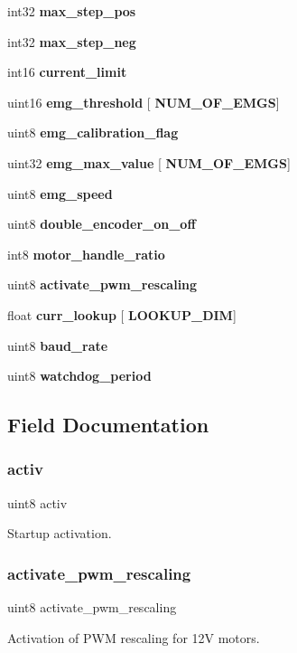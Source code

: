 \begin{DoxyCompactItemize}
int32 \textbf{ max\+\_\+step\+\_\+pos}
\item 
int32 \textbf{ max\+\_\+step\+\_\+neg}
\item 
int16 \textbf{ current\+\_\+limit}
\item 
uint16 \textbf{ emg\+\_\+threshold} [\textbf{ N\+U\+M\+\_\+\+O\+F\+\_\+\+E\+M\+GS}]
\item 
uint8 \textbf{ emg\+\_\+calibration\+\_\+flag}
\item 
uint32 \textbf{ emg\+\_\+max\+\_\+value} [\textbf{ N\+U\+M\+\_\+\+O\+F\+\_\+\+E\+M\+GS}]
\item 
uint8 \textbf{ emg\+\_\+speed}
\item 
uint8 \textbf{ double\+\_\+encoder\+\_\+on\+\_\+off}
\item 
int8 \textbf{ motor\+\_\+handle\+\_\+ratio}
\item 
uint8 \textbf{ activate\+\_\+pwm\+\_\+rescaling}
\item 
float \textbf{ curr\+\_\+lookup} [\textbf{ L\+O\+O\+K\+U\+P\+\_\+\+D\+IM}]
\item 
uint8 \textbf{ baud\+\_\+rate}
\item 
uint8 \textbf{ watchdog\+\_\+period}
\end{DoxyCompactItemize}


\subsection{Field Documentation}
\mbox{\label{structst__mem_a63bbebc1db55f43e0571006597a3488b}} 
\subsubsection{activ}
{\footnotesize\ttfamily uint8 activ}

Startup activation. \mbox{\label{structst__mem_a53d9d645351f4020826ab8c56c91b244}} 
\subsubsection{activate\+\_\+pwm\+\_\+rescaling}
{\footnotesize\ttfamily uint8 activate\+\_\+pwm\+\_\+rescaling}

Activation of P\+WM rescaling for 12V motors. \mbox{\label{structst__mem_a1a2b3002580421effeca67955a862580}} 
